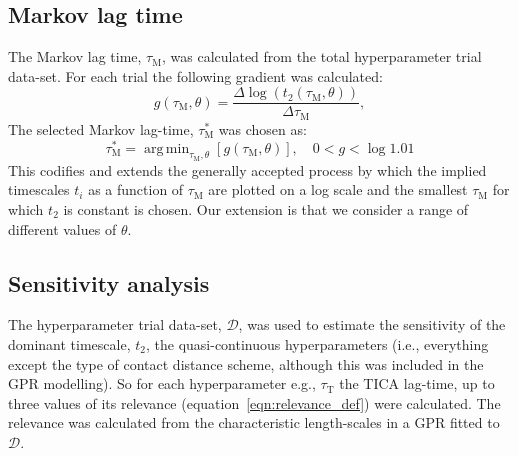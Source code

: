 \documentclass[journal=jacsat,manuscript=article]{achemso}
\DeclareMathOperator*{\argmin}{arg\,min}
\begin{document}
\subsection{Markov lag time}
The Markov lag time, $\tau_{\mathrm{M}}$, was calculated from the total hyperparameter trial data-set. For each trial the following gradient was calculated:
\begin{equation}
    g(\tau_{\mathrm{M}}, \theta) = \frac{\Delta \log{\left(t_{2}(\tau_{\mathrm{M}}, \theta)\right)}}{\Delta \tau_{\mathrm{M}}}, 
\end{equation}\label{eqn:choose_lag_1}
The selected Markov lag-time, $\tau^{*}_{\mathrm{M}}$ was chosen as:
\begin{equation}
    \tau^{*}_{\mathrm{M}}  = \argmin_{\tau_{\mathrm{M}}, \theta}\left[g(\tau_{\mathrm{M}}, \theta)\right], \quad 0 < g < \log{1.01}
\end{equation}\label{eqn:choose_lag_2}
This codifies and extends the generally accepted process by which the implied timescales $t_{i}$ as a function of $\tau_{\mathrm{M}}$ are plotted on a log scale and the smallest $\tau_{\mathrm{M}}$ for which $t_{2}$ is constant is chosen. Our extension is that we consider a range of different values of $\theta$. 

\subsection{Sensitivity analysis}

The hyperparameter trial data-set, $\mathcal{D}$, was used to estimate the sensitivity of the dominant timescale, $t_2$, the quasi-continuous hyperparameters (i.e., everything except the type of contact distance scheme, although this was included in the GPR modelling). So for each hyperparameter e.g., $\tau_{\mathrm{T}}$ the TICA lag-time, up to three values of its relevance (equation~\ref{eqn:relevance_def}) were calculated. The relevance was calculated from the characteristic length-scales in a GPR fitted to $\mathcal{D}$.  
\end{document}
